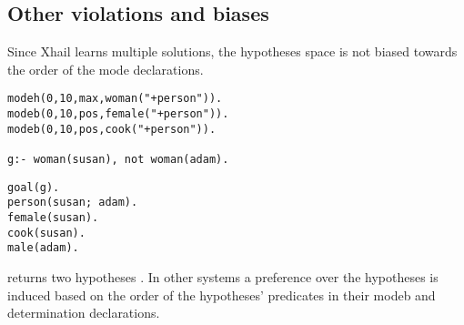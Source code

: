 \subsection{Other violations and biases}
Since Xhail learns multiple solutions, the hypotheses space is not biased towards the order of the mode declarations.

\begin{minipage}[t]{.50\textwidth}
\begin{lstlisting}
modeh(0,10,max,woman("+person")).
modeb(0,10,pos,female("+person")).
modeb(0,10,pos,cook("+person")).

g:- woman(susan), not woman(adam).
\end{lstlisting}
\end{minipage}
\begin{minipage}[t]{.20\textwidth}
\begin{lstlisting}
goal(g).
person(susan; adam).
female(susan).
cook(susan).
male(adam).
\end{lstlisting}
\end{minipage}

returns two hypotheses
. In other systems a preference over the hypotheses is induced based on the order of the hypotheses' predicates  in their modeb and determination declarations.
